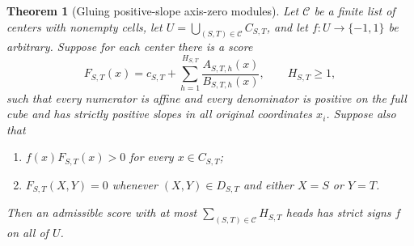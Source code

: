 \documentclass[11pt]{article}
\newtheorem{theorem}{Theorem}
\begin{document}
\begin{theorem}[Gluing positive-slope axis-zero modules]\label{thm:glue}
Let $\mathcal C$ be a finite list of centers with nonempty cells,
let $U=\bigcup_{(S,T)\in\mathcal C}C_{S,T}$, and let
$f:U\to\{-1,1\}$ be arbitrary. Suppose for each center there is a
score
\[
 F_{S,T}(x)=c_{S,T}+\sum_{h=1}^{H_{S,T}}
                    \frac{A_{S,T,h}(x)}{B_{S,T,h}(x)},
 \qquad H_{S,T}\geq1,
\]
such that every numerator is affine and every denominator is
positive on the full cube and has strictly positive slopes in all
original coordinates $x_i$. Suppose also that
\begin{enumerate}
\item $f(x)F_{S,T}(x)>0$ for every $x\in C_{S,T}$;
\item $F_{S,T}(X,Y)=0$ whenever $(X,Y)\in D_{S,T}$ and
either $X=S$ or $Y=T$.
\end{enumerate}
Then an admissible score with at most
$\sum_{(S,T)\in\mathcal C}H_{S,T}$ heads has strict signs $f$ on
all of $U$.
\end{theorem}
\end{document}
